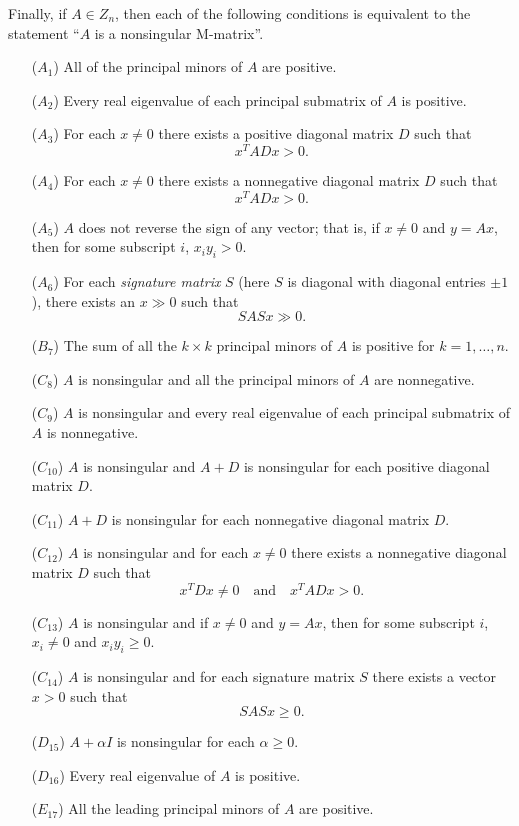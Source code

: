 \documentclass[aspectratio=169]{beamer}
\begin{document}
\begin{frame}
\begin{theorem}
\noindent Finally, if $A\in Z_n$, then each of the following conditions is equivalent to the statement ``$A$ is a nonsingular M-matrix''.
\begin{enumerate}
\item[($A_1$)] All of the principal minors of $A$ are positive.
\item[($A_2$)] Every real eigenvalue of each principal submatrix of $A$ is positive.
\item[($A_3$)] For each $x\neq 0$ there exists a positive diagonal matrix $D$ such that
\[
x^TADx>0.
\]
\item[($A_4$)] For each $x\neq 0$ there exists a nonnegative diagonal matrix $D$ such that
\[
x^TADx>0.
\]
\item[($A_5$)] $A$ does not reverse the sign of any vector; that is, if $x\neq 0$ and $y=Ax$, then for some subscript $i$, $x_iy_i>0$.
\item[($A_6$)] For each \emph{signature matrix} $S$ (here $S$ is diagonal with diagonal entries $\pm 1$), there exists an $x\gg 0$ such that
\[
SASx\gg 0.
\]
\item[($B_7$)] The sum of all the $k\times k$ principal minors of $A$ is positive for $k=1,\ldots,n$.
\item[($C_8$)] $A$ is nonsingular and all the principal minors of $A$ are nonnegative.
\item[($C_9$)] $A$ is nonsingular and every real eigenvalue of each principal submatrix of $A$ is nonnegative.
\item[($C_{10}$)] $A$ is nonsingular and $A+D$ is nonsingular for each positive diagonal matrix $D$.
\item[($C_{11}$)] $A+D$ is nonsingular for each nonnegative diagonal matrix $D$.
\item[($C_{12}$)] $A$ is nonsingular and for each $x\neq 0$ there exists a nonnegative diagonal matrix $D$ such that
\[
x^TDx\neq 0\quad\textrm{and}\quad x^TADx>0.
\]
\item[($C_{13}$)] $A$ is nonsingular and if $x\neq 0$ and $y=Ax$, then for some subscript $i$, $x_i\neq 0$ and $x_iy_i\geq 0$.
\item[($C_{14}$)] $A$ is nonsingular and for each signature matrix $S$ there exists a vector $x>0$ such that
\[
SASx\geq 0.
\]
\item[($D_{15}$)] $A+\alpha I$ is nonsingular for each $\alpha\geq 0$.
\item[($D_{16}$)] Every real eigenvalue of $A$ is positive.
\item[($E_{17}$)] All the leading principal minors of $A$ are positive.

\end{enumerate}
\end{theorem}
\end{frame}
\end{document}
